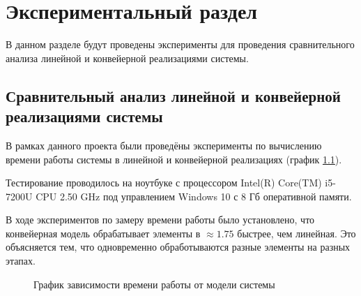 \chapter{Экспериментальный раздел}
\label{cha:research}
    В данном разделе будут проведены эксперименты для проведения 
    сравнительного анализа линейной и конвейерной реализациями системы.

    \section{Сравнительный анализ линейной и конвейерной реализациями системы}
        В рамках данного проекта были проведёны эксперименты по вычислению 
        времени работы системы в линейной и конвейерной реализациях (график \ref{graph:test}).

        Тестирование проводилось на ноутбуке с процессором
        Intel(R) Core(TM) i5-7200U CPU 2.50 GHz \cite{processor-i5-7200u}
        под управлением Windows 10 с 8 Гб оперативной памяти.

        В ходе экспериментов по замеру времени работы было установлено, что 
        конвейерная модель обрабатывает элементы в $ \approx 1.75 $
        быстрее, чем линейная. Это объясняется тем,
        что одновременно обработываются разные элементы на разных этапах.
        
    \begin{figure}[h!]
        \centering
        \caption{График зависимости времени работы от модели системы} 
        \label{graph:test}
    \end{figure}

\newpage